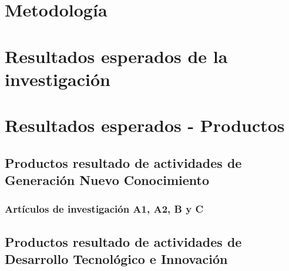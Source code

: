 \documentclass[12pt]{article}
\begin{document}
\section{Metodolog\'ia}

\section{Resultados esperados de la investigaci\'on}

\section{Resultados esperados - Productos}

 
\subsection{Productos resultado de actividades de Generación Nuevo
  Conocimiento} 

\subsubsection{Art\'iculos de investigaci\'on A1, A2, B y C}

\subsection{Productos resultado de actividades de Desarrollo
  Tecnol\'ogico e Innovaci\'on} 
\end{document}
